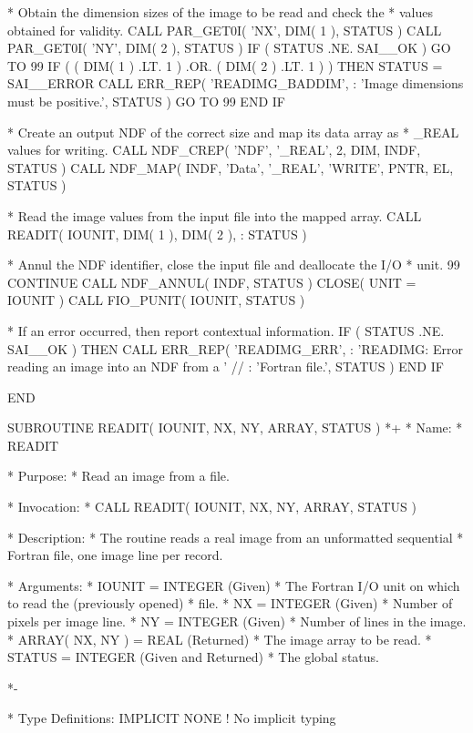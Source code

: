 \documentclass[twoside,11pt,nolof]{starlink}
\begin{document}
\begin{terminalv}
*  Obtain the dimension sizes of the image to be read and check the
*  values obtained for validity.
      CALL PAR_GET0I( 'NX', DIM( 1 ), STATUS )
      CALL PAR_GET0I( 'NY', DIM( 2 ), STATUS )
      IF ( STATUS .NE. SAI__OK ) GO TO 99
      IF ( ( DIM( 1 ) .LT. 1 ) .OR. ( DIM( 2 ) .LT. 1 ) ) THEN
         STATUS = SAI__ERROR
         CALL ERR_REP( 'READIMG_BADDIM',
     :   'Image dimensions must be positive.', STATUS )
         GO TO 99
      END IF

*  Create an output NDF of the correct size and map its data array as
*  _REAL values for writing.
      CALL NDF_CREP( 'NDF', '_REAL', 2, DIM, INDF, STATUS )
      CALL NDF_MAP( INDF, 'Data', '_REAL', 'WRITE', PNTR, EL, STATUS )

*  Read the image values from the input file into the mapped array.
      CALL READIT( IOUNIT, DIM( 1 ), DIM( 2 ), %
     :             STATUS )

*  Annul the NDF identifier, close the input file and deallocate the I/O
*  unit.
 99   CONTINUE
      CALL NDF_ANNUL( INDF, STATUS )
      CLOSE( UNIT = IOUNIT )
      CALL FIO_PUNIT( IOUNIT, STATUS )

*  If an error occurred, then report contextual information.
      IF ( STATUS .NE. SAI__OK ) THEN
         CALL ERR_REP( 'READIMG_ERR',
     :   'READIMG: Error reading an image into an NDF from a ' //
     :   'Fortran file.', STATUS )
      END IF

      END

      SUBROUTINE READIT( IOUNIT, NX, NY, ARRAY, STATUS )
*+
*  Name:
*     READIT

*  Purpose:
*     Read an image from a file.

*  Invocation:
*     CALL READIT( IOUNIT, NX, NY, ARRAY, STATUS )

*  Description:
*     The routine reads a real image from an unformatted sequential
*     Fortran file, one image line per record.

*  Arguments:
*     IOUNIT = INTEGER (Given)
*        The Fortran I/O unit on which to read the (previously opened)
*        file.
*     NX = INTEGER (Given)
*        Number of pixels per image line.
*     NY = INTEGER (Given)
*        Number of lines in the image.
*     ARRAY( NX, NY ) = REAL (Returned)
*        The image array to be read.
*     STATUS = INTEGER (Given and Returned)
*        The global status.

*-

*  Type Definitions:
      IMPLICIT NONE              ! No implicit typing


\end{terminalv}
\end{document}
